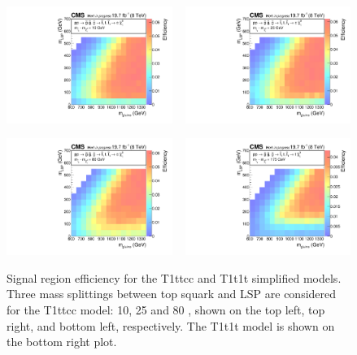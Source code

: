 \begin{figure}[p]
 \centering
 \includegraphics[width=0.48\textwidth]
 {figures/razor_interpretation/efficiency_T1ttcc_DM-10_g1Mbg1W0Ll_mdPhig0p5_BPS}
~
 \includegraphics[width=0.48\textwidth]
 {figures/razor_interpretation/efficiency_T1ttcc_DM-25_g1Mbg1W0Ll_mdPhig0p5_BPS} 

\includegraphics[width=0.48\textwidth]
{figures/razor_interpretation/efficiency_T1ttcc_DM-80_g1Mbg1W0Ll_mdPhig0p5_BPS} 
~
\includegraphics[width=0.48\textwidth]
{figures/razor_interpretation/efficiency_T1t1t_g1Mbg1W0Ll_mdPhig0p5_BPS} 
\caption{Signal region efficiency for the T1ttcc and T1t1t simplified models. Three mass splittings
between top squark and LSP are considered for the T1ttcc model: 10, 25 and 80 \GeV, shown on the top
left, top right, and bottom left, respectively. The T1t1t model is shown on the bottom right plot. 
 \label{fig:eff_T1ttcc_T1t1t}}
\end{figure}


